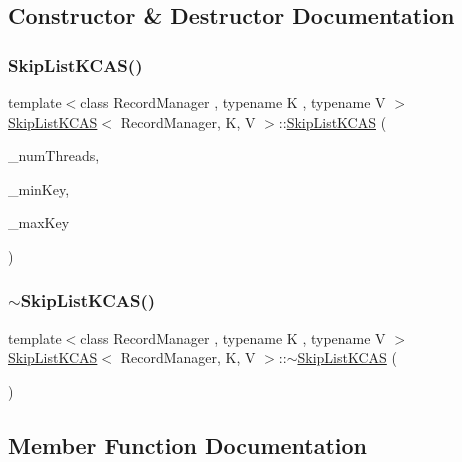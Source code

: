 \subsection{Constructor \& Destructor Documentation}
\mbox{\label{classSkipListKCAS_ad888a514bdad0bcd7e66d420aa812dfd}} 
\subsubsection{\texorpdfstring{Skip\+List\+K\+C\+A\+S()}{SkipListKCAS()}}
{\footnotesize\ttfamily template$<$class Record\+Manager , typename K , typename V $>$ \\
\hyperlink{classSkipListKCAS}{Skip\+List\+K\+C\+AS}$<$ Record\+Manager, K, V $>$\+::\hyperlink{classSkipListKCAS}{Skip\+List\+K\+C\+AS} (\begin{DoxyParamCaption}\item[{const int}]{\+\_\+num\+Threads,  }\item[{const int}]{\+\_\+min\+Key,  }\item[{const long long}]{\+\_\+max\+Key }\end{DoxyParamCaption})}

\mbox{\label{classSkipListKCAS_a300d303cd08e2eca1f1b26618976eaa7}} 
\subsubsection{\texorpdfstring{$\sim$\+Skip\+List\+K\+C\+A\+S()}{~SkipListKCAS()}}
{\footnotesize\ttfamily template$<$class Record\+Manager , typename K , typename V $>$ \\
\hyperlink{classSkipListKCAS}{Skip\+List\+K\+C\+AS}$<$ Record\+Manager, K, V $>$\+::$\sim$\hyperlink{classSkipListKCAS}{Skip\+List\+K\+C\+AS} (\begin{DoxyParamCaption}{ }\end{DoxyParamCaption})}



\subsection{Member Function Documentation}
\mbox{\label{classSkipListKCAS_a4136ad0113f56f3b6027f19b8a0bb2e4}} 
